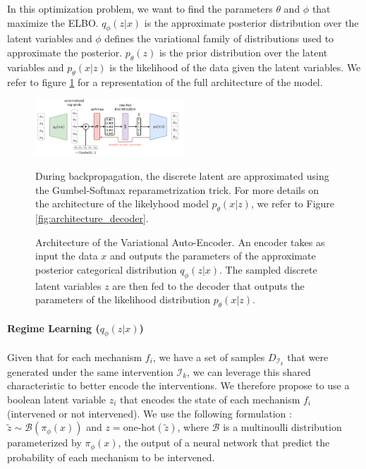 \documentclass{article}
\begin{document}
In this optimization problem, we want to find the parameters $\theta$ and $\phi$ that maximize the ELBO. $q_\phi(z | x)$ is the approximate posterior distribution over the latent variables and $\phi$ defines the variational family of distributions used to approximate the posterior. $p_\theta(z)$ is the prior distribution over the latent variables and $p_\theta(x | z)$ is the likelihood of the data given the latent variables. We refer to figure \ref{fig:architecture} for a representation of the full architecture of the model.
\begin{figure}
\centering
    \includegraphics[width=0.5\textwidth]{images/architecture.pdf}
    \caption{Architecture of the Variational Auto-Encoder. An encoder takes as input the data $x$ and outputs the parameters of the approximate posterior categorical distribution $q_\phi(z | x)$. The sampled discrete latent variables $z$ are then fed to the decoder that outputs the parameters of the likelihood distribution $p_\theta(x | z)$.} During backpropagation, the discrete latent are approximated using the Gumbel-Softmax reparametrization trick. For more details on the architecture of the likelyhood model $p_\theta(x | z)$, we refer to Figure \ref{fig:architecture_decoder}.
    \label{fig:architecture}
\end{figure}

\paragraph{Regime Learning ($q_\phi(z | x)$)}Given that for each mechanism $f_i$, we have a set of samples $D_{\mathcal{I}_k}$ that were generated under the same intervention $\mathcal{I}_k$, we can leverage this shared characteristic to better encode the interventions. We therefore propose to use a boolean latent variable $z_i$ that encodes the state of each mechanism $f_i$ (intervened or not intervened). We use the following formulation : $\tilde{z} \sim \mathcal{B}(\pi_\phi(x))$ and $z = \text{one-hot}(\tilde{z})$, where $\mathcal{B}$ is a multinoulli distribution parameterized by $\pi_\phi(x)$, the output of a neural network that predict the probability of each mechanism to be intervened.
\end{document}
